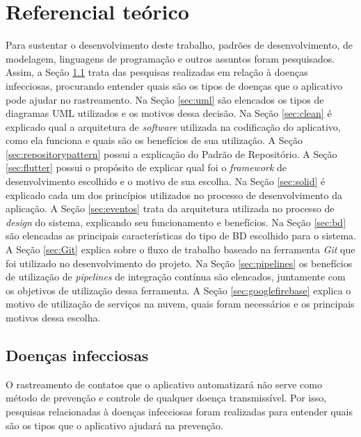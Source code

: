 \chapter{Referencial teórico}\label{chp:referencial}
Para sustentar o desenvolvimento deste trabalho, padrões de desenvolvimento, de modelagem, linguagens de programação e outros assuntos foram pesquisados. Assim, a Seção \ref{sec:infecciosas} trata das pesquisas realizadas em relação à doenças infecciosas, procurando entender quais são os tipos de doenças que o aplicativo pode ajudar no rastreamento. Na Seção \ref{sec:uml} são elencados os tipos de diagramas UML utilizados e os motivos dessa decisão. Na Seção \ref{sec:clean} é explicado qual a arquitetura de \textit{software} utilizada na codificação do aplicativo, como ela funciona e quais são os benefícios de sua utilização. A Seção \ref{sec:repositorypattern} possui a explicação do Padrão de Repositório. A Seção \ref{sec:flutter} possui o propósito de explicar qual foi o \textit{framework} de desenvolvimento escolhido e o motivo de sua escolha. Na Seção \ref{sec:solid} é explicado cada um dos princípios utilizados no processo de desenvolvimento da aplicação. A Seção \ref{sec:eventos} trata da arquitetura utilizada no processo de \textit{design} do sistema, explicando seu funcionamento e benefícios. Na Seção \ref{sec:bd} são elencadas as principais características do tipo de BD escolhido para o sistema. A Seção \ref{sec:Git} explica sobre o fluxo de trabalho baseado na ferramenta \textit{Git} que foi utilizado no desenvolvimento do projeto. Na Seção \ref{sec:pipelines} os benefícios de utilização de \textit{pipelines} de integração contínua são elencados, juntamente com os objetivos de utilização dessa ferramenta. A Seção \ref{sec:googlefirebase} explica o motivo de utilização de serviços na nuvem, quais foram necessários e os principais motivos dessa escolha.

\section{Doenças infecciosas}\label{sec:infecciosas}
O rastreamento de contatos que o aplicativo automatizará não serve como método de prevenção e controle de qualquer doença transmissível. Por isso, pesquisas relacionadas à doenças infecciosas foram realizadas para entender quais são os tipos que o aplicativo ajudará na prevenção.

